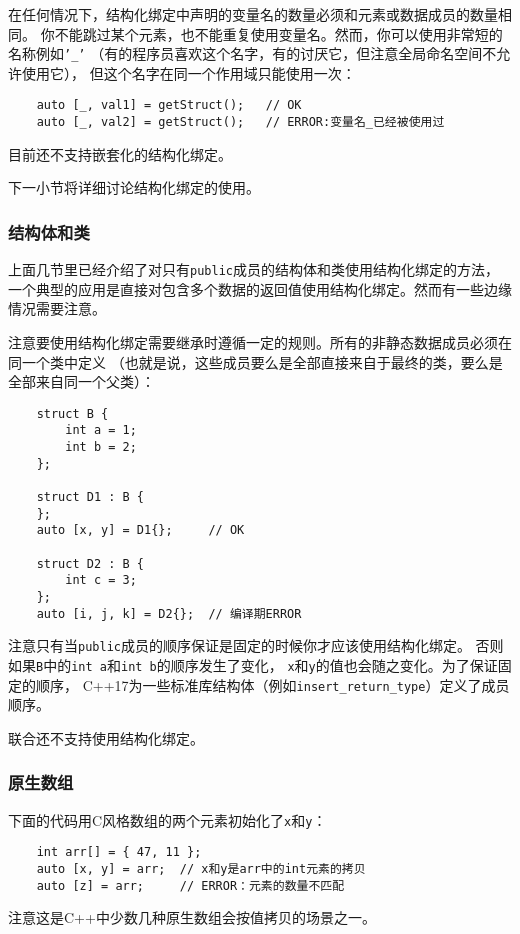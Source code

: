 在任何情况下，结构化绑定中声明的变量名的数量必须和元素或数据成员的数量相同。
你不能跳过某个元素，也不能重复使用变量名。然而，你可以使用非常短的名称例如\texttt{'\_'}
（有的程序员喜欢这个名字，有的讨厌它，但注意全局命名空间不允许使用它），
但这个名字在同一个作用域只能使用一次：
\begin{lstlisting}
    auto [_, val1] = getStruct();   // OK
    auto [_, val2] = getStruct();   // ERROR:变量名_已经被使用过
\end{lstlisting}
目前还不支持嵌套化的结构化绑定。

下一小节将详细讨论结构化绑定的使用。

\subsubsection{结构体和类}
上面几节里已经介绍了对只有\texttt{public}成员的结构体和类使用结构化绑定的方法，
一个典型的应用是直接对包含多个数据的返回值使用结构化绑定。然而有一些边缘情况需要注意。

注意要使用结构化绑定需要继承时遵循一定的规则。所有的非静态数据成员必须在同一个类中定义
（也就是说，这些成员要么是全部直接来自于最终的类，要么是全部来自同一个父类）：
\begin{lstlisting}
    struct B {
        int a = 1;
        int b = 2;
    };

    struct D1 : B {
    };
    auto [x, y] = D1{};     // OK

    struct D2 : B {
        int c = 3;
    };
    auto [i, j, k] = D2{};  // 编译期ERROR
\end{lstlisting}
注意只有当\texttt{public}成员的顺序保证是固定的时候你才应该使用结构化绑定。
否则如果\texttt{B}中的\texttt{int a}和\texttt{int b}的顺序发生了变化，
\texttt{x}和\texttt{y}的值也会随之变化。为了保证固定的顺序，
C++17为一些标准库结构体（例如\texttt{insert\_return\_type}）定义了成员顺序。

联合还不支持使用结构化绑定。

\subsubsection{原生数组}
下面的代码用C风格数组的两个元素初始化了\texttt{x}和\texttt{y}：
\begin{lstlisting}
    int arr[] = { 47, 11 };
    auto [x, y] = arr;  // x和y是arr中的int元素的拷贝
    auto [z] = arr;     // ERROR：元素的数量不匹配
\end{lstlisting}
注意这是C++中少数几种原生数组会按值拷贝的场景之一。

